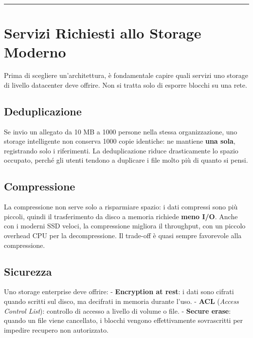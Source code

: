 \documentclass[
  italian,
  openany]{book}
\begin{document}
\begin{center}\rule{0.5\linewidth}{0.5pt}\end{center}

\section{Servizi Richiesti allo Storage
Moderno}\label{servizi-richiesti-allo-storage-moderno}

Prima di scegliere un'architettura, è fondamentale capire quali servizi
uno storage di livello datacenter deve offrire. Non si tratta solo di
esporre blocchi su una rete.

\subsection{Deduplicazione}\label{deduplicazione}

Se invio un allegato da 10 MB a 1000 persone nella stessa
organizzazione, uno storage intelligente non conserva 1000 copie
identiche: ne mantiene \textbf{una sola}, registrando solo i
riferimenti. La deduplicazione riduce drasticamente lo spazio occupato,
perché gli utenti tendono a duplicare i file molto più di quanto si
pensi.

\subsection{Compressione}\label{compressione}

La compressione non serve solo a risparmiare spazio: i dati compressi
sono più piccoli, quindi il trasferimento da disco a memoria richiede
\textbf{meno I/O}. Anche con i moderni SSD veloci, la compressione
migliora il throughput, con un piccolo overhead CPU per la
decompressione. Il trade-off è quasi sempre favorevole alla
compressione.

\subsection{Sicurezza}\label{sicurezza}

Uno storage enterprise deve offrire: - \textbf{Encryption at rest}: i
dati sono cifrati quando scritti sul disco, ma decifrati in memoria
durante l'uso. - \textbf{ACL} (\emph{Access Control List}): controllo di
accesso a livello di volume o file. - \textbf{Secure erase}: quando un
file viene cancellato, i blocchi vengono effettivamente sovrascritti per
impedire recupero non autorizzato.
\end{document}
